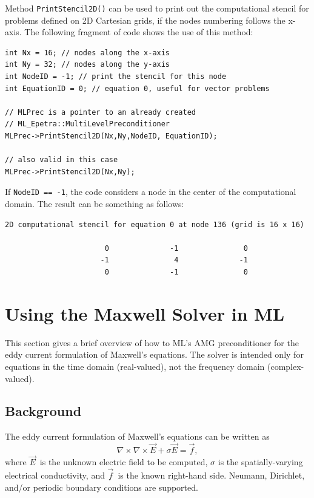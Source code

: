 \documentclass{article}[11pt]
\newcommand{\ML}     {{\bf ML}}
\begin{document}
Method \verb!PrintStencil2D()! can be used to print out the computational
stencil for problems defined on 2D Cartesian grids, if the nodes numbering
follows the x-axis. The following fragment of code shows the use of this
method:
\begin{verbatim}
int Nx = 16; // nodes along the x-axis
int Ny = 32; // nodes along the y-axis
int NodeID = -1; // print the stencil for this node
int EquationID = 0; // equation 0, useful for vector problems

// MLPrec is a pointer to an already created 
// ML_Epetra::MultiLevelPreconditioner
MLPrec->PrintStencil2D(Nx,Ny,NodeID, EquationID);

// also valid in this case
MLPrec->PrintStencil2D(Nx,Ny);
\end{verbatim}
If \verb!NodeID == -1!, the code considers a node in the center of the
computational domain. The result can be something as follows:
\begin{verbatim}
2D computational stencil for equation 0 at node 136 (grid is 16 x 16)

                       0              -1               0
                      -1               4              -1
                       0              -1               0
\end{verbatim}

\clearpage
\newpage

\section{Using the Maxwell Solver in \ML} \label{maxwell solver}
%
This section gives a brief overview of how to ML's AMG preconditioner for
the eddy current formulation of Maxwell's equations.
The solver is intended only for equations in the time domain (real-valued),
not the frequency domain (complex-valued).

\subsection{Background}\label{maxwell background}
The eddy current formulation of Maxwell's equations can be written as
\begin{equation} \label{maxwell pde}
\nabla\times\nabla\times \vec{E} + \sigma \vec{E} = \vec{f},
\end{equation}
where
$\vec{E}$\ is the unknown electric field to be computed,
$\sigma$ is the spatially-varying electrical conductivity,
and $\vec{f}$\ is the known right-hand side.
Neumann, Dirichlet, and/or periodic boundary conditions are supported.
\end{document}
